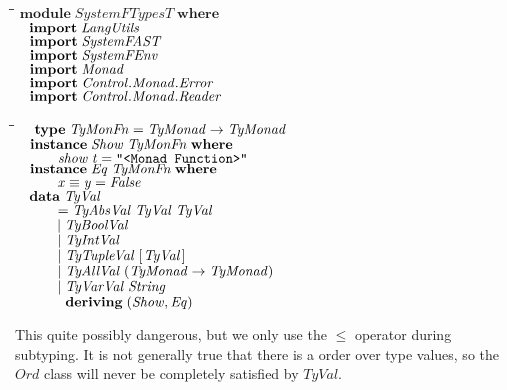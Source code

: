 \documentclass[10pt]{article}
\newlength{\lwidth}\setlength{\lwidth}{4.5cm}
\newlength{\cwidth}\setlength{\cwidth}{8mm} %
\newcommand{\Conid}[1]{\mathit{#1}}
\newcommand{\Varid}[1]{\mathit{#1}}
\renewcommand{\leq}{\leqslant}
\begin{document}
\begin{tabbing}
\qquad\=\hspace{\lwidth}\=\hspace{\cwidth}\=\+\kill
${\mathbf{module}\;\Conid{SystemFTypesT}\;\mathbf{where}}$\\
${\hskip1.00em\relax\mathbf{import}\;\Conid{LangUtils}}$\\
${\hskip1.00em\relax\mathbf{import}\;\Conid{SystemFAST}}$\\
${\hskip1.00em\relax\mathbf{import}\;\Conid{SystemFEnv}}$\\
${\hskip1.00em\relax\mathbf{import}\;\Conid{Monad}}$\\
${\hskip1.00em\relax\mathbf{import}\;\Conid{\Conid{Control}.\Conid{Monad}.Error}}$\\
${\hskip1.00em\relax\mathbf{import}\;\Conid{\Conid{Control}.\Conid{Monad}.Reader}}$
\end{tabbing}
\begin{tabbing}
\qquad\=\hspace{\lwidth}\=\hspace{\cwidth}\=\+\kill
${\hskip1.00em\relax\mathbf{type}\;\Conid{TyMonFn}\mathrel{=}\Conid{TyMonad}\to \Conid{TyMonad}}$\\
${}$\\
${\hskip1.00em\relax\mathbf{instance}\;\Conid{Show}\;\Conid{TyMonFn}\;\mathbf{where}}$\\
${\hskip1.00em\relax\hskip2.00em\relax\Varid{show}\;\Varid{t}\mathrel{=}\text{\tt \char34 <Monad~Function>\char34}}$\\
${}$\\
${\hskip1.00em\relax\mathbf{instance}\;\Conid{Eq}\;\Conid{TyMonFn}\;\mathbf{where}}$\\
${\hskip1.00em\relax\hskip2.00em\relax\Varid{x}\equiv \Varid{y}\mathrel{=}\Conid{False}}$\\
${}$\\
${\hskip1.00em\relax\mathbf{data}\;\Conid{TyVal}}$\\
${\hskip1.00em\relax\hskip2.00em\relax\mathrel{=}\Conid{TyAbsVal}\;\Conid{TyVal}\;\Conid{TyVal}}$\\
${\hskip1.00em\relax\hskip2.00em\relax\mid \Conid{TyBoolVal}}$\\
${\hskip1.00em\relax\hskip2.00em\relax\mid \Conid{TyIntVal}}$\\
${\hskip1.00em\relax\hskip2.00em\relax\mid \Conid{TyTupleVal}\;[\mskip1.5mu \Conid{TyVal}\mskip1.5mu]}$\\
${\hskip1.00em\relax\hskip2.00em\relax\mid \Conid{TyAllVal}\;(\Conid{TyMonad}\to \Conid{TyMonad})}$\\
${\hskip1.00em\relax\hskip2.00em\relax\mid \Conid{TyVarVal}\;\Conid{String}}$\\
${\hskip1.00em\relax\hskip2.00em\relax\phantom{\mid \mbox{}}\mathbf{deriving}\;(\Conid{Show},\Conid{Eq})}$
\end{tabbing}
This quite possibly dangerous, but we only use the \ensuremath{\leq } operator
during subtyping.  It is not generally true that there is a order over
type values, so the \ensuremath{\Conid{Ord}} class will never be completely satisfied by
\ensuremath{\Conid{TyVal}}.
\end{document}
